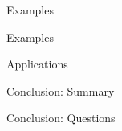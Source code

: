 \documentclass[pdf]{beamer}
\begin{document}
    \begin{frame}{Examples}

    \end{frame}

    \begin{frame}{Examples}

    \end{frame}

    \begin{frame}{Applications}

    \end{frame}

    \begin{frame}{Conclusion: Summary}

    \end{frame}

    \begin{frame}{Conclusion: Questions}

    \end{frame}
\end{document}
